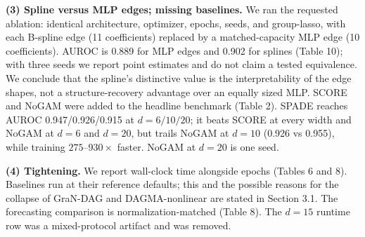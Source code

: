 \textbf{(3) Spline versus MLP edges; missing baselines.} We ran the requested ablation: identical architecture, optimizer, epochs, seeds, and group-lasso, with each B-spline edge (11 coefficients) replaced by a matched-capacity MLP edge (10 coefficients). AUROC is 0.889 for MLP edges and 0.902 for splines (Table 10); with three seeds we report point estimates and do not claim a tested equivalence. We conclude that the spline's distinctive value is the interpretability of the edge shapes, not a structure-recovery advantage over an equally sized MLP. SCORE and NoGAM were added to the headline benchmark (Table 2). SPADE reaches AUROC 0.947/0.926/0.915 at $d = 6/10/20$; it beats SCORE at every width and NoGAM at $d = 6$ and $d = 20$, but trails NoGAM at $d = 10$ (0.926 vs 0.955), while training $275$--$930\times$ faster. NoGAM at $d = 20$ is one seed.

\textbf{(4) Tightening.} We report wall-clock time alongside epochs (Tables 6 and 8). Baselines run at their reference defaults; this and the possible reasons for the collapse of GraN-DAG and DAGMA-nonlinear are stated in Section 3.1. The forecasting comparison is normalization-matched (Table 8). The $d = 15$ runtime row was a mixed-protocol artifact and was removed.
